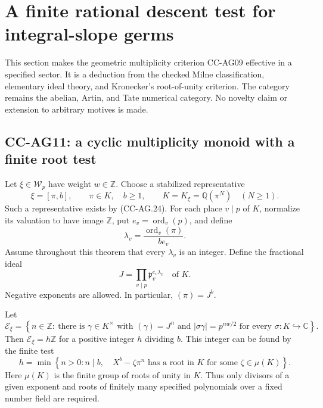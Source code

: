 \section{A finite rational descent test for integral-slope germs}

This section makes the geometric multiplicity criterion CC-AG09
effective in a specified sector.  It is a deduction from the
checked Milne classification, elementary ideal theory, and
Kronecker's root-of-unity criterion.  The category remains the
abelian, Artin, and Tate numerical category.  No novelty claim
or extension to arbitrary motives is made.

\subsection{CC-AG11: a cyclic multiplicity monoid with a finite root test}

Let \(\xi\in\mathcal W_p\) have weight \(w\in\mathbb Z\).
Choose a stabilized representative
\[
          \xi=[\pi,b],\qquad \pi\in K,\quad b\ge1,\qquad
          K=K_\xi=\mathbb Q(\pi^N)\quad(N\ge1).
                                                               \tag{CC-AG.50}
\]
Such a representative exists by (CC-AG.24).
For each place \(v\mid p\) of \(K\), normalize its
valuation to have image \(\mathbb Z\), put
\(e_v=\operatorname{ord}_v(p)\), and define
\[
       \lambda_v=\frac{\operatorname{ord}_v(\pi)}{b e_v}.
                                                               \tag{CC-AG.51}
\]
Assume throughout this theorem that every
\(\lambda_v\) is an integer.  Define the fractional ideal
\[
                   J=\prod_{v\mid p}\mathfrak p_v^{e_v\lambda_v}
                             \quad\text{of }K.                \tag{CC-AG.52}
\]
Negative exponents are allowed.  In particular,
\((\pi)=J^b\).

Let
\[
 \mathscr E_\xi=
 \left\{n\in\mathbb Z:\ \text{there is }\gamma\in K^\times
       \text{ with }(\gamma)=J^n
       \text{ and }|\sigma\gamma|=p^{nw/2}
                    \text{ for every }\sigma:K\hookrightarrow\mathbb C
 \right\}.
                                                               \tag{CC-AG.53}
\]
Then \(\mathscr E_\xi=h\mathbb Z\) for a positive integer
\(h\) dividing \(b\).
This integer can be found by the finite test
\[
 h=\min\left\{n>0:n\mid b,\quad
       X^b-\zeta\pi^n\text{ has a root in }K
                      \text{ for some }\zeta\in\mu(K)\right\}.
                                                               \tag{CC-AG.54}
\]
Here \(\mu(K)\) is the finite group of roots of unity in \(K\).
Thus only divisors of a given exponent and roots of finitely
many specified polynomials over a fixed number field are
required.

